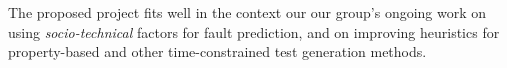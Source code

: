 \documentclass[10pt]{article}
\begin{document}
  The proposed project fits well in the context our our group's ongoing work on using \emph{socio-technical} factors for fault prediction, and on improving heuristics for property-based and other time-constrained test generation methods.




\footnotesize{
    
}
\end{document}
